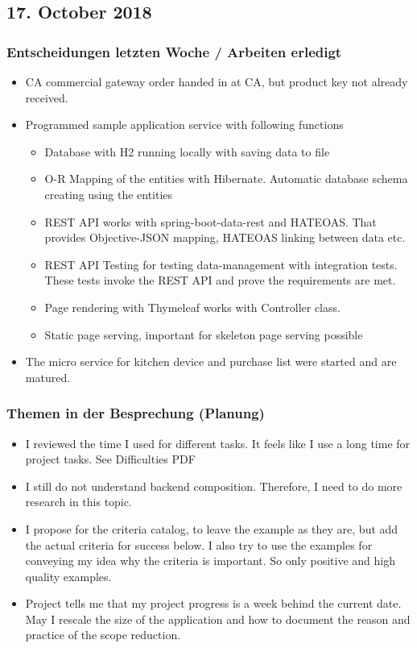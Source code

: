 \documentclass{article}
\begin{document}
        
    
\subsection{17. October 2018}

\subsubsection{Entscheidungen letzten Woche / Arbeiten erledigt}
\begin{itemize}
    \item CA commercial gateway order handed in at CA, but product key not already received.
    \item Programmed sample application service with following functions
        \begin{itemize}
            \item Database with H2 running locally with saving data to file
            \item O-R Mapping of the entities with Hibernate. Automatic database schema creating using the entities 
            \item REST API works with spring-boot-data-rest and HATEOAS. That provides Objective-JSON mapping, HATEOAS linking between data etc.
            \item REST API Testing for testing data-management with integration tests. These tests invoke the REST API and prove the requirements are met.
            \item Page rendering with Thymeleaf works with Controller class.
            \item Static page serving, important for skeleton page serving possible
        \end{itemize}
    \item The micro service for kitchen device and purchase list were started and are matured.
\end{itemize}

\subsubsection{Themen in der Besprechung (Planung)}
\begin{itemize}
    \item I reviewed the time I used for different tasks. It feels like I use a long time for project tasks. See Difficulties PDF
    \item I still do not understand backend composition. Therefore, I need to do more research in this topic.
    \item I propose for the criteria catalog, to leave the example as they are, but add the actual criteria for success below. I also try to use the examples for conveying my idea why the criteria is important. So only positive and high quality examples.
    \item Project tells me that my project progress is a week behind the current date. May I rescale the size of the application and how to document the reason and practice of the scope reduction.
\end{itemize}
\end{document}
